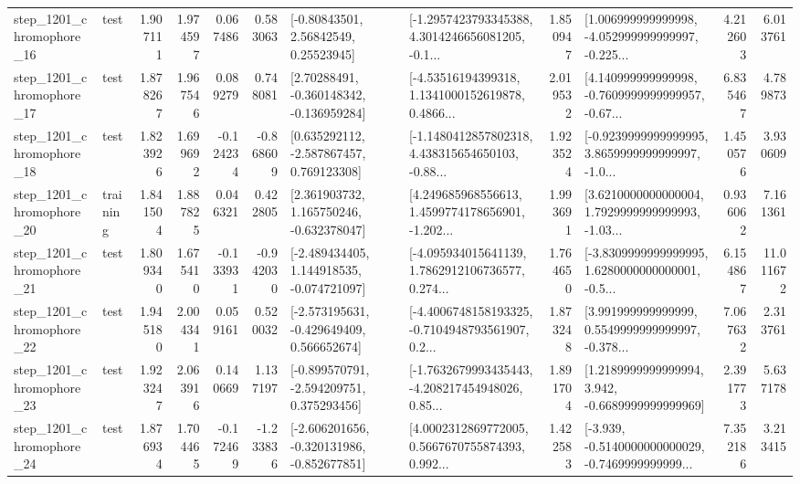 \begin{tabular}{llrrrrllrlrr}
 step\_1201\_chromophore\_16 &      test &      1.907111 &    1.974597 &      0.067486 &  0.583063 &       [-0.80843501, 2.56842549, 0.25523945] &  [-1.2957423793345388, 4.3014246656081205, -0.1... &       1.850947 &  [1.006999999999998, -4.052999999999997, -0.225... &            4.212603 &          6.013761 \\
 step\_1201\_chromophore\_17 &      test &      1.878267 &    1.967546 &      0.089279 &  0.748081 &    [2.70288491, -0.360148342, -0.136959284] &  [-4.53516194399318, 1.1341000152619878, 0.4866... &       2.019532 &  [4.140999999999998, -0.7609999999999957, -0.67... &            6.835467 &          4.789873 \\
 step\_1201\_chromophore\_18 &      test &      1.823926 &    1.699692 &     -0.124234 & -0.868609 &    [0.635292112, -2.587867457, 0.769123308] &  [-1.1480412857802318, 4.438315654650103, -0.88... &       1.923524 &  [-0.9239999999999995, 3.8659999999999997, -1.0... &            1.450576 &          3.930609 \\
 step\_1201\_chromophore\_20 &  training &      1.841504 &    1.887825 &      0.046321 &  0.422805 &    [2.361903732, 1.165750246, -0.632378047] &  [4.249685968556613, 1.4599774178656901, -1.202... &       1.993691 &  [3.6210000000000004, 1.7929999999999993, -1.03... &            0.936062 &          7.161361 \\
 step\_1201\_chromophore\_21 &      test &      1.809340 &    1.675410 &     -0.133931 & -0.942030 &   [-2.489434405, 1.144918535, -0.074721097] &  [-4.095934015641139, 1.7862912106736577, 0.274... &       1.764650 &  [-3.8309999999999995, 1.6280000000000001, -0.5... &            6.154867 &         11.011672 \\
 step\_1201\_chromophore\_22 &      test &      1.945180 &    2.004341 &      0.059161 &  0.520032 &   [-2.573195631, -0.429649409, 0.566652674] &  [-4.4006748158193325, -0.7104948793561907, 0.2... &       1.873248 &  [3.991999999999999, 0.5549999999999997, -0.378... &            7.067632 &          2.313761 \\
 step\_1201\_chromophore\_23 &      test &      1.923247 &    2.063916 &      0.140669 &  1.137197 &   [-0.899570791, -2.594209751, 0.375293456] &  [-1.7632679993435443, -4.208217454948026, 0.85... &       1.891704 &   [1.2189999999999994, 3.942, -0.6689999999999969] &            2.391773 &          5.637178 \\
 step\_1201\_chromophore\_24 &      test &      1.876934 &    1.704465 &     -0.172469 & -1.233836 &  [-2.606201656, -0.320131986, -0.852677851] &  [4.0002312869772005, 0.5667670755874393, 0.992... &       1.422583 &  [-3.939, -0.5140000000000029, -0.7469999999999... &            7.352186 &          3.213415 \\

\end{tabular}

